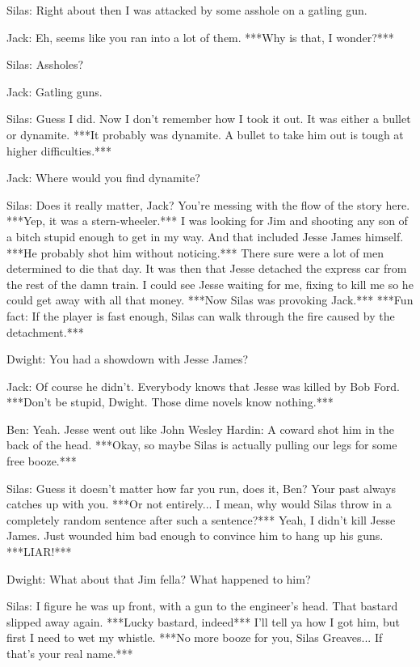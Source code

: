\documentclass{article}
\begin{document}
Silas: Right about then I was attacked by some asshole on a gatling gun.

Jack: Eh, seems like you ran into a lot of them. ***Why is that, I wonder?***

Silas: Assholes?

Jack: Gatling guns.

Silas: Guess I did. Now I don't remember how I took it out. It was either a bullet or dynamite. ***It probably was dynamite. A bullet to take him out is tough at higher difficulties.***

Jack: Where would you find dynamite?

Silas: Does it really matter, Jack? You're messing with the flow of the story here. ***Yep, it was a stern-wheeler.*** I was looking for Jim and shooting any son of a bitch stupid enough to get in my way. And that included Jesse James himself. ***He probably shot him without noticing.*** There sure were a lot of men determined to die that day. It was then that Jesse detached the express car from the rest of the damn train. I could see Jesse waiting for me, fixing to kill me so he could get away with all that money. ***Now Silas was provoking Jack.*** ***Fun fact: If the player is fast enough, Silas can walk through the fire caused by the detachment.***

Dwight: You had a showdown with Jesse James?

Jack: Of course he didn't. Everybody knows that Jesse was killed by Bob Ford. ***Don't be stupid, Dwight. Those dime novels know nothing.***

Ben: Yeah. Jesse went out like John Wesley Hardin: A coward shot him in the back of the head. ***Okay, so maybe Silas is actually pulling our legs for some free booze.***

Silas: Guess it doesn't matter how far you run, does it, Ben? Your past always catches up with you. ***Or not entirely... I mean, why would Silas throw in a completely random sentence after such a sentence?*** Yeah, I didn't kill Jesse James. Just wounded him bad enough to convince him to hang up his guns. ***LIAR!***

Dwight: What about that Jim fella? What happened to him?

Silas: I figure he was up front, with a gun to the engineer's head. That bastard slipped away again. ***Lucky bastard, indeed*** I'll tell ya how I got him, but first I need to wet my whistle. ***No more booze for you, Silas Greaves... If that's your real name.***
\end{document}
